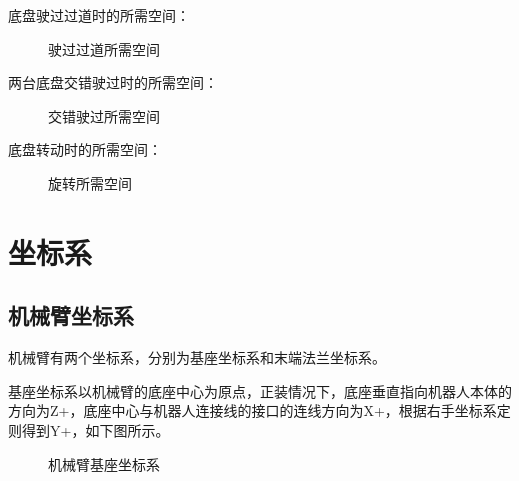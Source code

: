 \documentclass[a4paper,11pt,english,openany,oneside]{sphinxmanual}
\begin{document}
\sphinxAtStartPar
底盘驶过过道时的所需空间：

\begin{figure}[H]
\centering
\capstart

\noindent{}
\caption{驶过过道所需空间}\label{\detokenize{07 _u6280_u672f_u89c4_u683c:id90}}\end{figure}



\sphinxAtStartPar
两台底盘交错驶过时的所需空间：

\begin{figure}[H]
\centering
\capstart

\noindent{}
\caption{交错驶过所需空间}\label{\detokenize{07 _u6280_u672f_u89c4_u683c:id91}}\end{figure}



\sphinxAtStartPar
底盘转动时的所需空间：

\begin{figure}[H]
\centering
\capstart

\noindent{}
\caption{旋转所需空间}\label{\detokenize{07 _u6280_u672f_u89c4_u683c:id92}}\end{figure}




\section{坐标系}
\label{\detokenize{07 _u6280_u672f_u89c4_u683c:id51}}\label{\detokenize{07 _u6280_u672f_u89c4_u683c:id52}}

\subsection{机械臂坐标系}
\label{\detokenize{07 _u6280_u672f_u89c4_u683c:id53}}\label{\detokenize{07 _u6280_u672f_u89c4_u683c:id54}}
\sphinxAtStartPar
机械臂有两个坐标系，分别为基座坐标系和末端法兰坐标系。

\sphinxAtStartPar
基座坐标系以机械臂的底座中心为原点，正装情况下，底座垂直指向机器人本体的方向为Z+，底座中心与机器人连接线的接口的连线方向为X+，根据右手坐标系定则得到Y+，如下图所示。

\begin{figure}[H]
\centering
\capstart

\noindent{}
\caption{机械臂基座坐标系}\label{\detokenize{07 _u6280_u672f_u89c4_u683c:id93}}\end{figure}
\end{document}
